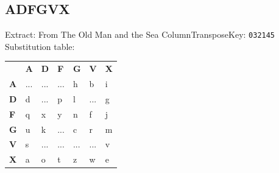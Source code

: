 \documentclass{article}
\begin{document}
\subsection{ADFGVX}
Extract: From The Old Man and the Sea
ColumnTransposeKey: \texttt{032145}\\
Substitution table:
\\
\begin{table}[H]
\begin{tabular}{lllllll}
\textbf{} &
  \textbf{A} &
  \textbf{D} &
  \textbf{F} &
  \textbf{G} &
  \textbf{V} &
  \textbf{X} \\ \cline{2-7}
\multicolumn{1}{l|}{\textbf{A}} &
  \multicolumn{1}{l|}{...} &
  \multicolumn{1}{l|}{...} &
  \multicolumn{1}{l|}{...} &
  \multicolumn{1}{l|}{h} &
  \multicolumn{1}{l|}{b} &
  \multicolumn{1}{l|}{i} \\ \cline{2-7}
\multicolumn{1}{l|}{\textbf{D}} &
  \multicolumn{1}{l|}{d} &
  \multicolumn{1}{l|}{...} &
  \multicolumn{1}{l|}{p} &
  \multicolumn{1}{l|}{l} &
  \multicolumn{1}{l|}{...} &
  \multicolumn{1}{l|}{g} \\ \cline{2-7}
\multicolumn{1}{l|}{\textbf{F}} &
  \multicolumn{1}{l|}{q} &
  \multicolumn{1}{l|}{x} &
  \multicolumn{1}{l|}{y} &
  \multicolumn{1}{l|}{n} &
  \multicolumn{1}{l|}{f} &
  \multicolumn{1}{l|}{j} \\ \cline{2-7}
\multicolumn{1}{l|}{\textbf{G}} &
  \multicolumn{1}{l|}{u} &
  \multicolumn{1}{l|}{k} &
  \multicolumn{1}{l|}{...} &
  \multicolumn{1}{l|}{c} &
  \multicolumn{1}{l|}{r} &
  \multicolumn{1}{l|}{m} \\ \cline{2-7}
\multicolumn{1}{l|}{\textbf{V}} &
  \multicolumn{1}{l|}{s} &
  \multicolumn{1}{l|}{...} &
  \multicolumn{1}{l|}{...} &
  \multicolumn{1}{l|}{...} &
  \multicolumn{1}{l|}{...} &
  \multicolumn{1}{l|}{v} \\ \cline{2-7}
\multicolumn{1}{l|}{\textbf{X}} &
  \multicolumn{1}{l|}{a} &
  \multicolumn{1}{l|}{o} &
  \multicolumn{1}{l|}{t} &
  \multicolumn{1}{l|}{z} &
  \multicolumn{1}{l|}{w} &
  \multicolumn{1}{l|}{e} \\ \cline{2-7}
\end{tabular}
\end{table}
\end{document}
